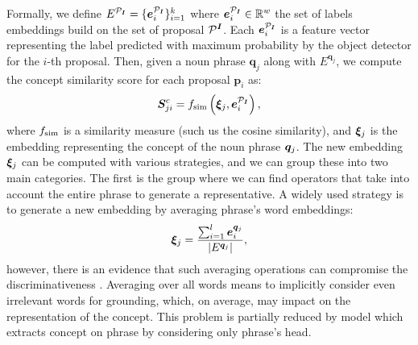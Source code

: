 Formally, we define $E^{\mathcal{P}_{\bm{I}}} = \{ \bm{e}^{\mathcal{P}_{\bm{I}}}_i \}^{k}_{i=1}$ where $\bm{e}^{\mathcal{P}_{\bm{I}}}_i \in
\mathbb{R}^w$ the set of labels embeddings build on the set of proposal
$\mathcal{P}^{\bm{I}}$. Each $\bm{e}^{\mathcal{P}_{\bm{I}}}_i$ is a feature vector representing the
label predicted with maximum probability by the object detector for
the $i$-th proposal. Then, given a noun phrase $\bm{q}_j$ along with
$E^{\bm{q}_j}$, we compute the concept similarity score for each
proposal $\bm{p}_i$ as:
\begin{equation}
  \bm{S}^c_{ji} = f_{\text{sim}} \left( \bm{\xi}_j, \bm{e}^{\mathcal{P}_{\bm{I}}}_i \right),
\end{equation}
where $f_{\text{sim}}$ is a similarity measure (such us the cosine similarity),
and $\bm{\xi}_j$ is the embedding representing the concept of the noun
phrase $\bm{q}_j$. The new embedding $\bm{\xi}_j$ can be computed with various
strategies, and we can group these into two main categories. The first
is the group where we can find operators that take into account the
entire phrase to generate a representative. A widely used strategy is
to generate a new embedding by averaging phrase's word embeddings:
\begin{equation}
  \bm{\xi}_j = \frac{\sum^l_{i=1} \bm{e}^{\bm{q}_j}_i}{| E^{\bm{q}_j} |},
\end{equation}
however, there is an evidence that such averaging operations can
compromise the discriminativeness
\cite{wang2019phrase,datta2019align2ground}. Averaging over all words
means to implicitly consider even irrelevant words for grounding,
which, on average, may impact on the representation of the concept.
This problem is partially reduced by model which extracts concept on
phrase by considering only phrase's head.

